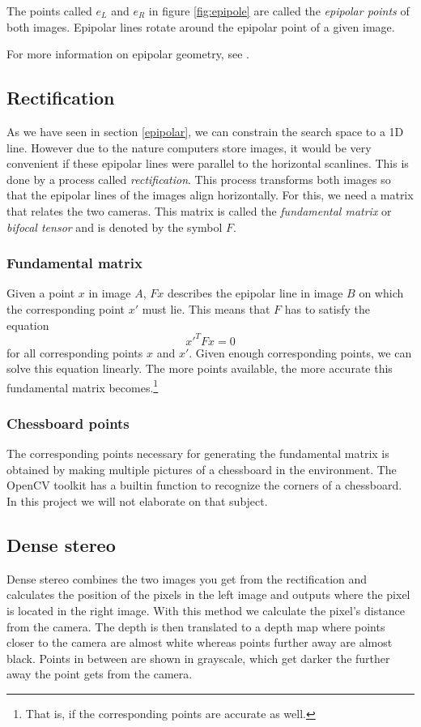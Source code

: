 \documentclass[a4paper]{article}
\begin{document}
The points called $e_{L}$ and $e_{R}$ in figure \ref{fig:epipole} are called the
\emph{epipolar points} of both images. Epipolar lines rotate around the epipolar
point of a given image.

For more information on epipolar geometry, see \cite{Hartley2004}.

\subsection{Rectification}
\label{rectification}
As we have seen in section \ref{epipolar}, we can constrain the search space to
a 1D line. However due to the nature computers store images, it would be very
convenient if these epipolar lines were parallel to the horizontal scanlines.
This is done by a process called \emph{rectification}. This process transforms
both images so that the epipolar lines of the images align horizontally. For
this, we need a matrix that relates the two cameras. This matrix is called the
\emph{fundamental matrix} or \emph{bifocal tensor} and is denoted by the symbol
$F$.

\subsubsection{Fundamental matrix}
Given a point $x$ in image $A$, $Fx$ describes the epipolar line in image
$B$ on which the corresponding point $x'$ must lie. This means that $F$ has to
satisfy the equation
\[ x'^{T}Fx = 0 \]
for all corresponding points $x$ and $x'$. Given enough corresponding points, we
can solve this equation linearly. The more points available, the more accurate
this fundamental matrix becomes.\footnote{That is, if the corresponding points
are accurate as well.}

\subsubsection{Chessboard points}
The corresponding points necessary for generating the fundamental matrix is
obtained by making multiple pictures of a chessboard in the environment. The
OpenCV toolkit has a builtin function to recognize the corners of a chessboard.
In this project we will not elaborate on that subject.

\subsection{Dense stereo}
Dense stereo combines the two images you get from the rectification
and calculates the position of the pixels in the left image and
outputs where the pixel is located in the right image. With this method we
calculate the pixel's distance from the camera. 
The depth is then translated to a depth map where points closer
to the camera are almost white whereas points further away are almost
black. Points in between are shown in grayscale, which get darker
 the further away the point gets from the camera.
\end{document}
